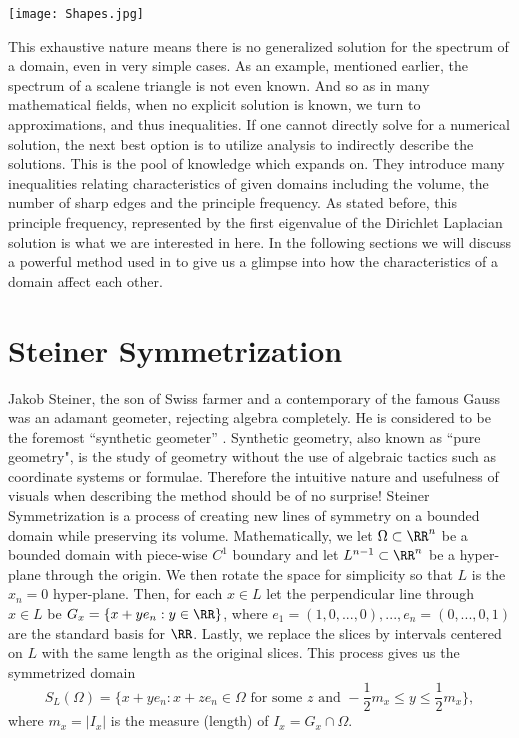\documentclass[12pt]{report}
\numberwithin{definition}{section}
\begin{document}
 	\texttt{[image: Shapes.jpg]}
 	
 	
 This exhaustive nature means there is no generalized solution for the spectrum of a domain, even in very simple cases. As an example, mentioned earlier, the spectrum of a scalene triangle is not even known. And so as in many mathematical fields, when no explicit solution is known, we turn to approximations, and thus inequalities. If one cannot directly solve for a numerical solution, the next best option is to utilize analysis to indirectly describe the solutions. This is the pool of knowledge which \cite{Polya} expands on. They introduce many inequalities relating characteristics of given domains including the volume, the number of sharp edges and the principle frequency. As stated before, this principle frequency, represented by the first eigenvalue of the Dirichlet Laplacian solution is what we are interested in here. In the following sections we will discuss a powerful method used in \cite{Polya} to give us a glimpse into how the characteristics of a domain affect each other. 
 
\break

\section {Steiner Symmetrization}

Jakob Steiner, the son of Swiss farmer and a contemporary of the famous Gauss was an adamant geometer, rejecting algebra completely. He is considered to be the foremost ``synthetic geometer'' \cite{Treibergs}. Synthetic geometry, also known as ``pure geometry", is the study of geometry without the use of algebraic tactics such as coordinate systems or formulae. Therefore the intuitive nature and usefulness of visuals when describing the method should be of no surprise! Steiner Symmetrization is a process of creating new lines of symmetry on a bounded domain while preserving its volume. Mathematically, we let $\Omega \subset \RR^n$ be a bounded domain with piece-wise $C^1$ boundary and let $L^{n-1} \subset \RR^n$ be a hyper-plane through the origin. We then rotate the space for simplicity so that $L$ is the $x_n=0$ hyper-plane. Then, for each $x \in L$ let the perpendicular line through $x \in L$ be $G_x = \{x+ye_n : y \in \RR\}$, where $e_1=(1, 0, ... , 0), ... , e_n = (0, ... , 0, 1)$ are the standard basis for $\RR$. Lastly, we replace the slices by intervals centered on $L$ with the same length as the original slices. This process gives us the symmetrized domain 
\[
S_L(\Omega) =  \{x+ye_n: x+z e_n \in \Omega \mbox{ for some $z$ and } -\frac{1}{2}m_x \leq y \leq \frac{1}{2}m_x\} ,
\]
where $m_x = |I_x|$ is the measure (length) of $I_x = G_x \cap  \Omega$.
\end{document}
